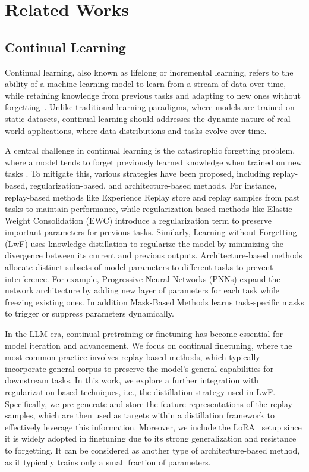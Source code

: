 
\section{Related Works}\label{sec:Related Works}


\subsection{Continual Learning}
Continual learning, also known as lifelong or incremental learning, refers to the ability of a machine learning model to learn from a stream of data over time, while retaining knowledge from previous tasks and adapting to new ones without forgetting~\cite{parisi2019continual}. Unlike traditional learning paradigms, where models are trained on static datasets, continual learning should addresses the dynamic nature of real-world applications, where data distributions and tasks evolve over time.

A central challenge in continual learning is the catastrophic forgetting problem, where a model tends to forget previously learned knowledge when trained on new tasks \cite{french1999catastrophic}. To mitigate this, various strategies have been proposed, including replay-based, regularization-based, and architecture-based methods. For instance, replay-based methods like Experience Replay \cite{rolnick2019experience} store and replay samples from past tasks to maintain performance, while regularization-based methods like Elastic Weight Consolidation (EWC) \cite{kirkpatrick2017overcoming} introduce a regularization term to preserve important parameters for previous tasks. Similarly, Learning without Forgetting (LwF) \cite{li2017learning} uses knowledge distillation to regularize the model by minimizing the divergence between its current and previous outputs. Architecture-based methods allocate distinct subsets of model parameters to different tasks to prevent interference. For example, Progressive Neural Networks (PNNs) \cite{rusu2016progressive} expand the network architecture by adding new layer of parameters for each task while freezing existing ones. In addition Mask-Based Methods \cite{mallya2018piggyback} learns task-specific masks to trigger or suppress parameters dynamically.

In the LLM era, continual pretraining or finetuning has become essential for model iteration and advancement. We focus on continual finetuning, where the most common practice involves replay-based methods, which typically incorporate general corpus to preserve the model's general capabilities for downstream tasks.
In this work, we explore a further integration with regularization-based techniques, i.e., the distillation strategy used in LwF. Specifically, we pre-generate and store the feature representations of the replay samples, which are then used as targets within a distillation framework to effectively leverage this information.
Moreover, we include the LoRA~\cite{hu2022lora} setup since it is widely adopted in finetuning due to its strong generalization and resistance to forgetting. It can be considered as another type of architecture-based method, as it typically trains only a small fraction of parameters.


